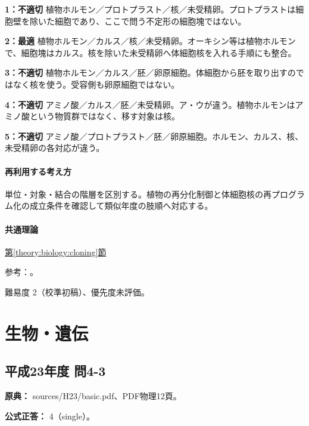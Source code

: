 \noindent\textbf{1：不適切} 植物ホルモン／プロトプラスト／核／未受精卵。プロトプラストは細胞壁を除いた細胞であり、ここで問う不定形の細胞塊ではない。\par

\noindent\textbf{2：最適} 植物ホルモン／カルス／核／未受精卵。オーキシン等は植物ホルモンで、細胞塊はカルス。核を除いた未受精卵へ体細胞核を入れる手順にも整合。\par

\noindent\textbf{3：不適切} 植物ホルモン／カルス／胚／卵原細胞。体細胞から胚を取り出すのではなく核を使う。受容側も卵原細胞ではない。\par

\noindent\textbf{4：不適切} アミノ酸／カルス／胚／未受精卵。ア・ウが違う。植物ホルモンはアミノ酸という物質群ではなく、移す対象は核。\par

\noindent\textbf{5：不適切} アミノ酸／プロトプラスト／胚／卵原細胞。ホルモン、カルス、核、未受精卵の各対応が違う。\par

\paragraph{再利用する考え方} 単位・対象・結合の階層を区別する。植物の再分化制御と体細胞核の再プログラム化の成立条件を確認して類似年度の肢順へ対応する。

\paragraph{共通理論} \hyperref[theory:biology:cloning]{第\ref*{theory:biology:cloning}節}

\par 参考：\cite{plant_regeneration,nhgri_cloning}。

\par 難易度 2（校準初稿）、優先度未評価。

\section{生物・遺伝}

\subsection{平成23年度 問4-3}
\label{q:h23-reg-basic-4-3}

\noindent\textbf{原典：} sources/H23/basic.pdf、PDF物理12頁。

\textbf{公式正答：} 4（single）。


